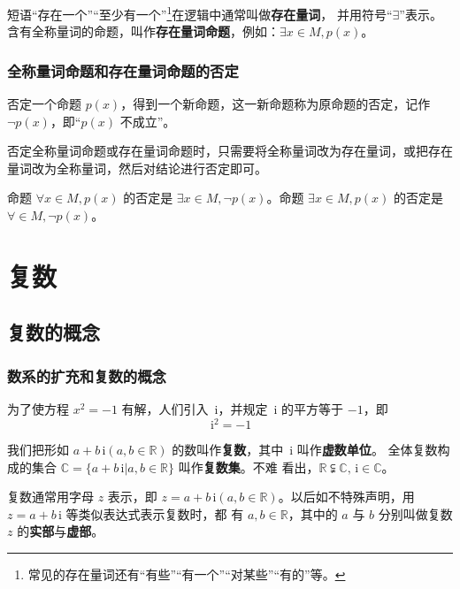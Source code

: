 \documentclass[a4paper,openany]{ctexbook}
\newcommand{\ii}{\,\mathrm{i}}
\begin{document}
短语“存在一个”“至少有一个”\footnote{常见的存在量词还有“有些”“有一个”“对某些”“有的”等。}在逻辑中通常叫做\textbf{存在量词}，
并用符号“\(\exists\)”表示。含有全称量词的命题，叫作\textbf{存在量词命题}，例如：\(\exists x \in M,p(x)\)。

\subsection{全称量词命题和存在量词命题的否定}

否定一个命题 \(p(x)\)，得到一个新命题，这一新命题称为原命题的否定，记作 \(\lnot p(x)\)，即“\(p(x)\) 不成立”。

否定全称量词命题或存在量词命题时，只需要将全称量词改为存在量词，或把存在量词改为全称量词，然后对结论进行否定即可。

命题 \(\forall x \in M, p(x)\) 的否定是 \(\exists x \in M, \lnot p(x)\)。命题 \(\exists x \in M, p(x)\) 的否定是 \(\forall \in M, \lnot p(x)\)。

\chapter{复数} %

\section{复数的概念}

\subsection{数系的扩充和复数的概念}

为了使方程 \(x^2=-1\) 有解，人们引入 \(\ii\)，并规定 \(\ii\) 的平方等于 \(-1\)，即
\[
    \ii^2=-1
\]

我们把形如 \(a+b \ii(a,b\in \mathbb{R})\) 的数叫作\textbf{复数}，其中 \(\ii\) 叫作\textbf{虚数单位}。
全体复数构成的集合 \(\mathbb{C}=\{a+b \ii|a,b\in \mathbb{R}\}\) 叫作\textbf{复数集}。不难
看出，\(\mathbb{R}\subsetneqq \mathbb{C}, \ii\in \mathbb{C}\)。

复数通常用字母 \(z\) 表示，即 \(z=a+b \ii(a,b\in \mathbb{R})\)。以后如不特殊声明，用 \(z=a+b \ii\) 等类似表达式表示复数时，都
有 \(a,b\in \mathbb{R}\)，其中的 \(a\) 与 \(b\) 分别叫做复数 \(z\) 的\textbf{实部}与\textbf{虚部}。
\end{document}
